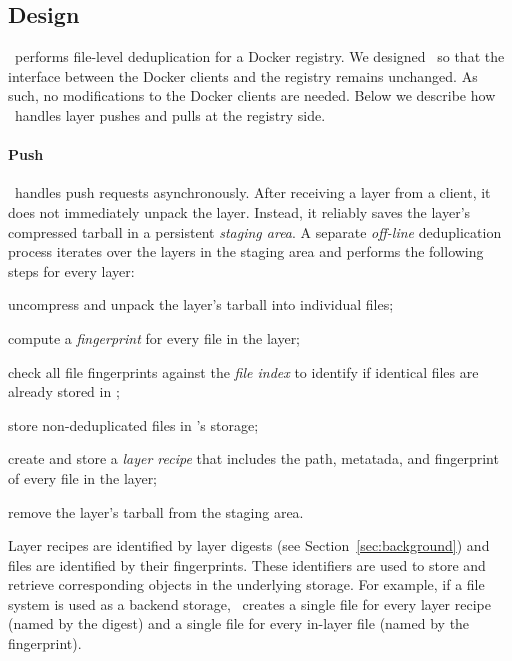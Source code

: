 \subsection{Design}
\label{sec:design}

\sysname\ performs file-level deduplication for a Docker registry.
%
We designed \sysname\ so that the interface between the Docker clients and the
registry remains unchanged.
%
As such, no modifications to the Docker clients are needed.
%
Below we describe how \sysname\ handles layer pushes and
pulls at the registry side.
%

\paragraph{Push}
%
\sysname\ handles push requests asynchronously.
%
After receiving a layer from a client, it does not immediately unpack the layer.
%
Instead, it reliably saves the layer's compressed tarball in a persistent
\emph{staging area}.
%
A separate \emph{off-line} deduplication process iterates over the layers in
the staging area and performs the following steps for every layer:
%
\begin{compactenumerate}
  \item uncompress and unpack the layer's tarball into individual files;
  \item compute a \emph{fingerprint} for every file in the layer;
  \item check all file fingerprints against the \emph{file index} to
	identify if identical files are already stored in \sysname;
  \item store non-deduplicated files in \sysname's storage;
  \item create and store a \emph{layer recipe} that includes the path,
	metatada, and fingerprint of every file in the layer;
  \item remove the layer's tarball from the staging area.
\end{compactenumerate}

%
%
Layer recipes are identified by layer digests (see Section~\ref{sec:background})
and files are identified by their fingerprints.
%
These identifiers are used to store and retrieve corresponding objects in the
underlying storage.
%
For example, if a file system is used as a backend storage, \sysname\ creates a
single file for every layer recipe (named by the digest) and a single file for
every in-layer file (named by the fingerprint).


